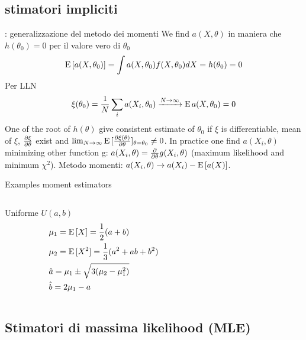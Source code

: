 \documentclass[asd-beamer.tex]{subfiles}%
\begin{document}
\subsection{stimatori impliciti}

\begin{frame}{: generalizzazione del metodo dei momenti}
We find $a(X,\theta)$ in maniera che $h(\theta_0)=0$ per il valore vero di $\theta_0$
\[\operatorname{E}{[a(X,\theta_0)]}=\int a(X,\theta_0)f(X,\theta_0)dX=h(\theta_0)=0\]
Per LLN \[\xi(\theta_0)=\frac{1}{N}\sum_ia(X_i,\theta_0)\xrightarrow{N\to\infty}\operatorname{E}{a(X,\theta_0)}=0\]
One of the root of $h(\theta)$ give consistent estimate of $\theta_0$ if $\xi$ is differentiable, mean of $\xi$, $\frac{\partial \xi}{\partial \theta}$ exist and $\lim_{N\to\infty}\operatorname{E}{[\frac{\partial \xi(\theta)}{\partial \theta}]_{\theta=\theta_0}}\neq0$.
In practice one find $a(X_i,\theta)$ minimizing other function g: $a(X_i,\theta)=\frac{\partial}{\partial \theta}g(X_i,\theta)$ (maximum likelihood and minimum $\chi^2$).
Metodo momenti: $a(X_i,\theta)\to a(X_i)-\operatorname{E}{[a(X)]}$.
\end{frame}

\begin{wordonframe}{Examples moment estimators}
\begin{columns}[T]\begin{column}{0.5\textwidth}
\begin{block}{Uniforme $U(a,b)$}
\begin{align*}
&\mu_1=\operatorname{E}{[X]}=\frac{1}{2}(a+b)\\
&\mu_2=\operatorname{E}{[X^2]}=\frac{1}{3}(a^2+ab+b^2)\\
&\hat{a}=\mu_1\pm\sqrt{3(\mu_2-\mu_1^2)}\\
&\hat{b}=2\mu_1-a
\end{align*}
\end{block}
\end{column}\begin{column}{0.5\textwidth}

\end{column}\end{columns}
\end{wordonframe}

\subsection{Stimatori di massima likelihood (MLE)}
\end{document}
